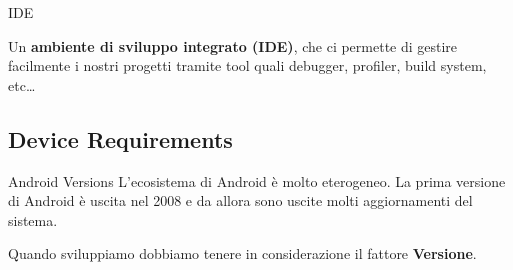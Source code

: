 \documentclass[xcolor=svgnames,11pt]{beamer}
\begin{document}
\begin{frame}{IDE}

Un \textbf{ambiente di sviluppo integrato (IDE)}, che ci permette di gestire facilmente i nostri progetti tramite tool quali debugger, profiler, build system, etc\ldots

\pause
\begin{center}
\bigskip
{}
\end{center}

\end{frame}

\subsection{Device Requirements}

\begin{frame}{Android Versions}
L'ecosistema di Android \`e molto eterogeneo. La prima versione di Android \`e uscita nel 2008 e da allora sono uscite molti aggiornamenti del sistema.

\medskip

\begin{center}


\end{center}

\pause
\medskip

Quando sviluppiamo dobbiamo tenere in considerazione il fattore \textbf{Versione}.
\end{frame}
\end{document}
